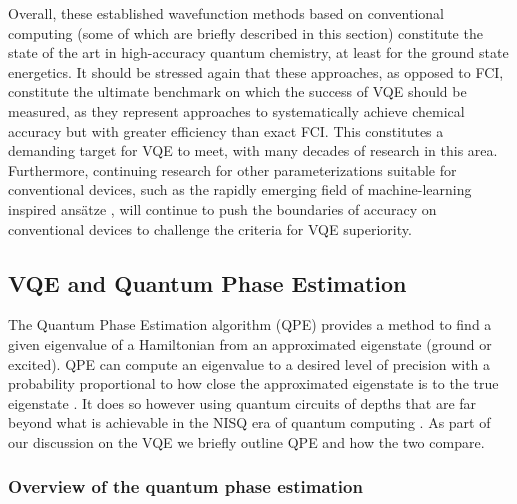 Overall, these established wavefunction methods based on conventional computing (some of which are briefly described in this section) constitute the state of the art in high-accuracy quantum chemistry, at least for the ground state energetics. It should be stressed again that these approaches, as opposed to FCI, constitute the ultimate benchmark on which the success of VQE should be measured, as they represent approaches to systematically achieve chemical accuracy but with greater efficiency than exact FCI. This constitutes a demanding target for VQE to meet, with many decades of research in this area. Furthermore, continuing research for other parameterizations suitable for conventional devices, such as the rapidly emerging field of machine-learning inspired ans\"atze \cite{Carleo2017, Nomura2017, Choo2018, Glielmo2020, Luo2019, Pfau2020, Choo2020, Hermann2020}, will continue to push the boundaries of accuracy on conventional devices to challenge the criteria for VQE superiority.

\subsection{VQE and Quantum Phase Estimation} \label{sec:vqe_vs_qpe}
 
The Quantum Phase Estimation algorithm (QPE) \cite{Kitaev1995, Abrams1997, abramsQuantumAlgorithmProviding1998, Cleve1998, AspuruGuzik2005} provides a method to find a given eigenvalue of a Hamiltonian from an approximated eigenstate (ground or excited). QPE can compute an eigenvalue to a desired level of precision with a probability proportional to how close the approximated eigenstate is to the true eigenstate \cite{McClean2014}. It does so however using quantum circuits of depths that are far beyond what is achievable in the NISQ era of quantum computing \cite{reiherElucidatingReactionMechanisms2017}. As part of our discussion on the VQE we briefly outline QPE and how the two compare.    

\subsubsection{Overview of the quantum phase estimation}

